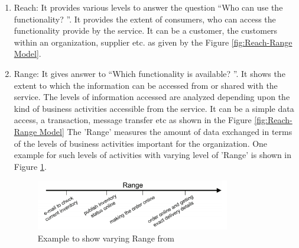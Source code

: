 \begin{enumerate}
\item Reach: It provides various levels to answer the question “Who can use the functionality? ”.  It provides the extent of consumers, who can access the functionality provide  by the service. It can be a customer, the customers within an organization, supplier etc. as given by the Figure \ref{fig:Reach-Range Model}.
\\
\item Range: It gives answer to “Which functionality is available? ”. It shows the extent to which the information can be accessed from or shared with the service. The levels of information accessed are analyzed depending upon the kind of business activities accessible from the service. It can be a simple data access, a transaction, message transfer etc as shown in the Figure \ref{fig:Reach-Range Model} The 'Range' measures the amount of data exchanged in terms of the levels of business activities important for the organization. One example for such levels of activities with varying level of 'Range' is shown in Figure \ref{fig:Range Example}.

\begin{figure}[H]
\begin{center}
\includegraphics[width=0.8\textwidth]{figures/Granularity-R3-two}
\caption{Example to show varying Range from \cite{Keen:2015aa, Weill:1998aa}}
\label{fig:Range Example}
\end{center}
\end{figure}


\end{enumerate}
